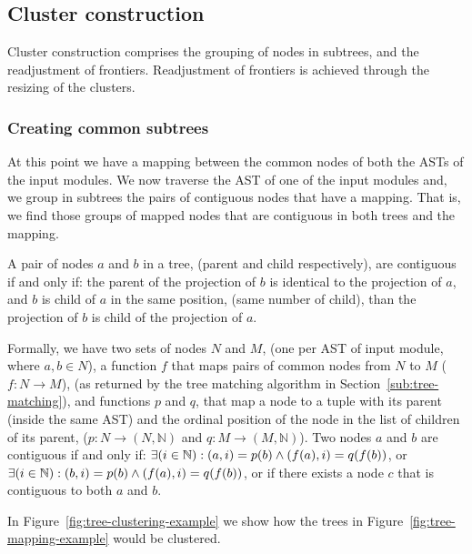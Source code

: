 \subsection{Cluster construction}

Cluster construction comprises the grouping of nodes in subtrees,
and the readjustment of frontiers. Readjustment of frontiers is achieved
through the resizing of the clusters.


\subsubsection{Creating common subtrees}

At this point we have a mapping between the common nodes of both the
ASTs of the input modules. We now traverse the AST of one of the input
modules and, we group in subtrees the pairs of contiguous nodes that
have a mapping. That is, we find those groups of mapped nodes that
are contiguous in both trees and the mapping.

A pair of nodes $a$ and $b$ in a tree, (parent and child respectively),
are contiguous if and only if: the parent of the projection of $b$
is identical to the projection of $a$, and $b$ is child of $a$
in the same position, (same number of child), than the projection
of $b$ is child of the projection of $a$.

Formally, we have two sets of nodes $N$ and $M$, (one per AST of
input module, where $a,b\in N$), a function $f$ that maps pairs
of common nodes from $N$ to $M$ ($f:N\rightarrow M$), (as returned
by the tree matching algorithm in Section~\ref{sub:tree-matching}),
and functions $p$ and $q$, that map a node to a tuple with its parent
(inside the same AST) and the ordinal position of the node in the
list of children of its parent, ($p:N\rightarrow(N,\mathbb{N})$ and
$q:M\rightarrow(M,\mathbb{N})$). Two nodes $a$ and $b$ are contiguous
if and only if: $\exists(i\in\text{\ensuremath{\mathbb{N}})}:(a,i)=p(b)\land(f(a),i)=q(f(b))$,
or $\exists(i\in\text{\ensuremath{\mathbb{N}})}:(b,i)=p(b)\land(f(a),i)=q(f(b))$,
or if there exists a node $c$ that is contiguous to both $a$ and
$b$.

In Figure~\ref{fig:tree-clustering-example} we show how the trees
in Figure~\ref{fig:tree-mapping-example} would be clustered.


